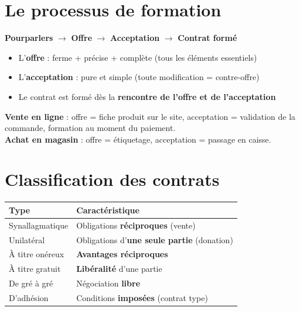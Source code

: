 \documentclass[11pt,a4paper]{article}
\begin{document}
\section*{Le processus de formation}

\begin{center}
\textbf{Pourparlers} $\rightarrow$ \textbf{Offre} $\rightarrow$ \textbf{Acceptation} $\rightarrow$ \textbf{Contrat formé}
\end{center}

\begin{itemize}
  \item L'\textbf{offre} : ferme + précise + complète (tous les éléments essentiels)
  \item L'\textbf{acceptation} : pure et simple (toute modification = contre-offre)
  \item Le contrat est formé dès la \textbf{rencontre de l'offre et de l'acceptation}
\end{itemize}

\begin{exbox}
\textbf{Vente en ligne} : offre = fiche produit sur le site, acceptation = validation de la commande, formation au moment du paiement.\\
\textbf{Achat en magasin} : offre = étiquetage, acceptation = passage en caisse.
\end{exbox}

\section*{Classification des contrats}

\begin{center}
\begin{tabular}{|l|l|}
\hline
\textbf{Type} & \textbf{Caractéristique} \\
\hline
Synallagmatique & Obligations \textbf{réciproques} (vente) \\
Unilatéral & Obligations d'\textbf{une seule partie} (donation) \\
À titre onéreux & \textbf{Avantages réciproques} \\
À titre gratuit & \textbf{Libéralité} d'une partie \\
De gré à gré & Négociation \textbf{libre} \\
D'adhésion & Conditions \textbf{imposées} (contrat type) \\
\hline
\end{tabular}
\end{center}
\end{document}
